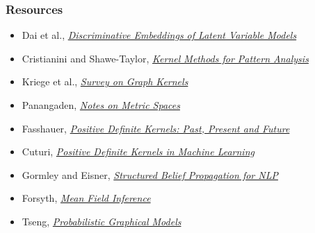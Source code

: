 \documentclass{beamer}
\begin{document}
    \begin{frame}
        \frametitle{Resources}
        \begin{itemize}
            \item Dai et al., \textit{\href{https://arxiv.org/pdf/1603.05629.pdf}{Discriminative Embeddings of Latent Variable Models}}
            \item Cristianini and Shawe-Taylor, \textit{\href{https://people.eecs.berkeley.edu/~jordan/kernels/0521813972c03_p47-84.pdf}{Kernel Methods for Pattern Analysis}}
            \item Kriege et al., \textit{\href{https://arxiv.org/pdf/1903.11835.pdf}{Survey on Graph Kernels}}
            \item Panangaden, \textit{\href{https://www.cs.mcgill.ca/~prakash/Courses/599/Notes/metric_spaces.pdf}{Notes on Metric Spaces}}
            \item Fasshauer, \textit{\href{http://www.math.iit.edu/~fass/PDKernels.pdf}{Positive Definite Kernels: Past, Present and Future}}
            \item Cuturi, \textit{\href{https://marcocuturi.net/Papers/pdk_in_ml.pdf}{Positive Definite Kernels in Machine Learning}}
            \item Gormley and Eisner, \textit{\href{http://www.cs.cmu.edu/~mgormley/bp-tutorial/}{Structured Belief Propagation for NLP}}
            \item Forsyth, \textit{\href{http://luthuli.cs.uiuc.edu/~daf/courses/AutonomousCars/autoencodernotes.pdf}{Mean Field Inference}}
            \item Tseng, \textit{\href{https://frnsys.com/ai_notes/foundations/probabilistic_graphical_models.html}{Probabilistic Graphical Models}}
        \end{itemize}
    \end{frame}
\end{document}
